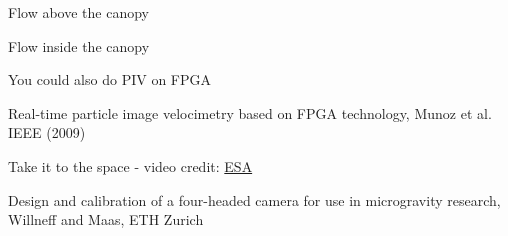     
    
    
    
    
    
    \begin{frame}[label=app-12]{Flow above the canopy}
    \centering
    \end{frame}
    
    \begin{frame}[label=app-11]{Flow inside the canopy}
    \centering
    \end{frame}
    
    
%    
%    
    \begin{frame}[label=app-110a]{You could also do PIV on FPGA}
    \begin{cardTiny}
    Real-time particle image velocimetry based on FPGA technology, Munoz et al. IEEE (2009)
    \end{cardTiny}
    \end{frame}
%    
%    
\begin{frame}[label=app-11a]{Take it to the space - video credit: \href{https://www.dropbox.com/s/59ophf177gcfjzq/boiling_microgravity.mp4?raw=1}{ESA}}
    \begin{cardTiny}
    Design and calibration of a four-headed camera for use in microgravity research, Willneff and Maas, ETH Zurich
    \end{cardTiny}
\end{frame}
    

